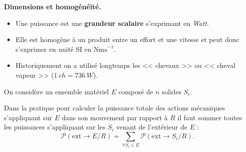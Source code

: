 \begin{warn}\textbf{Dimensions et homogénéité.}
\begin{itemize}
\item Une puissance est une \textbf{grandeur scalaire} s'exprimant en \textit{Watt}.
\item Elle est homogène à un produit entre un effort et une vitesse et peut donc s'exprimer en unité SI en $\text{Nms}^{-1}$.
\item Historiquement on a utilisé longtemps les << chevaux >> ou << cheval vapeur >> ($\SI{1}{ch}= \SI{736}{W}$).
\end{itemize}

\end{warn}

\begin{prop}
On considère un ensemble matériel $E$ composé de $n$ solides $S_i$. 

Dans la pratique pour calculer la puissance totale des actions mécaniques s'appliquant sur $E$ dans son mouvement par rapport à $R$ il faut sommer toutes les puissances s'appliquant sur les $S_i$ venant de l'extérieur de $E$ :
$$
\mathcal{P}(\text{ext} \rightarrow E/R)=\displaystyle{\sum_{\forall S_i \in E}\mathcal{P}(\text{ext} \rightarrow S_i/R)}.
$$
\end{prop}

%
%
%

